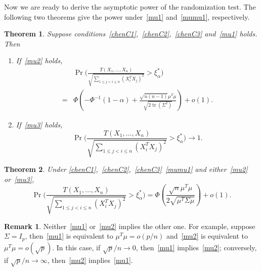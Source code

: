 \documentclass[review]{elsarticle}
\DeclareMathOperator{\mytr}{tr}
\theoremstyle{plain}
\newtheorem{theorem}{\quad\quad Theorem}
\theoremstyle{definition}
\newtheorem{remark}{\quad\quad Remark}
\theoremstyle{remark}
\begin{document}
Now we are ready to derive the asymptotic power of the randomization test.
The following two theorems give the power under~\eqref{mu1} and~\eqref{mumu1}, respectively.

\begin{theorem}\label{theoremPower}
    Suppose conditions~\eqref{chenC1},~\eqref{chenC2},~\eqref{chenC3} and~\eqref{mu1} holds. Then
    \begin{enumerate}
        \item
    If~\eqref{mu2} holds,
    \begin{equation}\label{oPower}
        \begin{aligned}
            &\Pr\Big(\frac{T( X_1,\ldots, X_n)}{\sqrt{\sum_{1\leq j<i\leq n}{(X_i^T X_j)}^2}}>\xi_{\alpha}^* \Big)\\
            =&
            \Phi(-\Phi^{-1}(1-\alpha)+\frac{\sqrt{n(n-1)}\mu^T\mu}{\sqrt{2\mytr (\Sigma^2)}})+o(1).
        \end{aligned}
    \end{equation}
\item
    If~\eqref{mu3} holds,
    \begin{equation*}
            \Pr\Big(\frac{T( X_1,\ldots, X_n)}{\sqrt{\sum_{1\leq j<i\leq n}{(X_i^T X_j)}^2}}>\xi_{\alpha}^* \Big)\to 1.
    \end{equation*}
    \end{enumerate}
\end{theorem}

\begin{theorem}\label{theoremPower2}
    Under \eqref{chenC1},~\eqref{chenC2},~\eqref{chenC3}~\eqref{mumu1} and either~\eqref{mu2} or~\eqref{mu3},
    \begin{equation*}
            \Pr\Big(\frac{T( X_1,\ldots, X_n)}{\sqrt{\sum_{1\leq j<i\leq n}{(X_i^T X_j)}^2}}>\xi_{\alpha}^* \Big)
            =
            \Phi(\frac{\sqrt{n}\mu^T\mu}{2\sqrt{\mu^T \Sigma \mu}})+o(1).
    \end{equation*}
\end{theorem}

\begin{remark}
    Neither~\eqref{mu1} or~\eqref{mu2} implies the other one.
    For example, suppose $\Sigma=I_p$, then~\eqref{mu1} is equivalent to $\mu^T\mu=o(p/n)$ and~\eqref{mu2} is equivalent to $\mu^T \mu =o(\sqrt{p})$.
    In this case, if $\sqrt{p}/n\to 0$, then~\eqref{mu1} implies~\eqref{mu2}; conversely, if $\sqrt{p}/n\to \infty$, then~\eqref{mu2} implies~\eqref{mu1}.
\end{remark}
\end{document}

